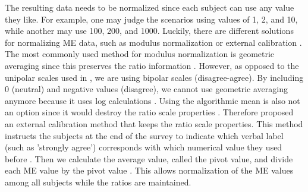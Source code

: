 \documentclass[a4paper]{article}
\begin{document}
The resulting data needs to be normalized since each subject can use any value they like. For example, one may judge the scenarios using values of 1, 2, and 10, while another may use 100, 200, and 1000. Luckily, there are different solutions for normalizing ME data, such as modulus normalization or external calibration \cite{moskowitz1977magnitude}. The most commonly used method for modulus normalization is geometric averaging since this preserves the ratio information \cite{moskowitz1977magnitude, mcgee2004master}. However, as opposed to the unipolar scales used in \cite{bard1996magnitude, mcgee2004master}, we are using bipolar scales (disagree-agree). By including 0 (neutral) and negative values (disagree), we cannot use geometric averaging anymore because it uses log calculations \cite{moskowitz1977magnitude}. Using the algorithmic mean is also not an option since it would destroy the ratio scale properties \cite{moskowitz1977magnitude}. Therefore \cite{moskowitz1977magnitude} proposed an external calibration method that keeps the ratio scale properties. This method instructs the subjects at the end of the survey to indicate which verbal label (such as 'strongly agree') corresponds with which numerical value they used before \cite{moskowitz1977magnitude}. Then we calculate the average value, called the pivot value, and divide each ME value by the pivot value \cite{moskowitz1977magnitude}. This allows normalization of the ME values among all subjects while the ratios are maintained.
\end{document}
